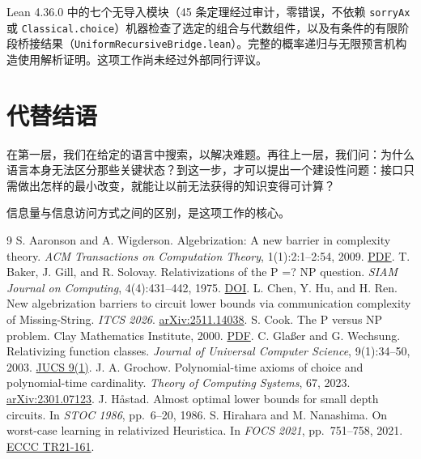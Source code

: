 \documentclass[11pt,a4paper]{article}
\begin{document}
Lean 4.36.0 中的七个无导入模块（45 条定理经过审计，零错误，不依赖 \texttt{sorryAx} 或 \texttt{Classical.choice}）机器检查了选定的组合与代数组件，以及有条件的有限阶段桥接结果（\texttt{UniformRecursiveBridge.lean}）。完整的概率递归与无限预言机构造使用解析证明。这项工作尚未经过外部同行评议。

\section{代替结语}
在第一层，我们在给定的语言中搜索，以解决难题。再往上一层，我们问：为什么语言本身无法区分那些关键状态？到这一步，才可以提出一个建设性问题：接口只需做出怎样的最小改变，就能让以前无法获得的知识变得可计算？

信息量与信息访问方式之间的区别，是这项工作的核心。
\begin{thebibliography}{9}
 S. Aaronson and A. Wigderson. Algebrization: A new barrier in complexity theory. \textit{ACM Transactions on Computation Theory}, 1(1):2:1--2:54, 2009. \href{https://www.scottaaronson.com/papers/alg.pdf}{PDF}.
 T. Baker, J. Gill, and R. Solovay. Relativizations of the P =? NP question. \textit{SIAM Journal on Computing}, 4(4):431--442, 1975. \href{https://epubs.siam.org/doi/10.1137/0204037}{DOI}.
 L. Chen, Y. Hu, and H. Ren. New algebrization barriers to circuit lower bounds via communication complexity of Missing-String. \textit{ITCS 2026}. \href{https://arxiv.org/abs/2511.14038}{arXiv:2511.14038}.
 S. Cook. The P versus NP problem. Clay Mathematics Institute, 2000. \href{https://www.claymath.org/wp-content/uploads/2022/06/pvsnp.pdf}{PDF}.
 C. Glaßer and G. Wechsung. Relativizing function classes. \textit{Journal of Universal Computer Science}, 9(1):34--50, 2003. \href{https://lib.jucs.org/issue/4069/}{JUCS 9(1)}.
 J. A. Grochow. Polynomial-time axioms of choice and polynomial-time cardinality. \textit{Theory of Computing Systems}, 67, 2023. \href{https://arxiv.org/abs/2301.07123}{arXiv:2301.07123}.
 J. H\aa stad. Almost optimal lower bounds for small depth circuits. In \textit{STOC 1986}, pp.~6--20, 1986.
 S. Hirahara and M. Nanashima. On worst-case learning in relativized Heuristica. In \textit{FOCS 2021}, pp.~751--758, 2021. \href{https://eccc.weizmann.ac.il/report/2021/161/download}{ECCC TR21-161}.
\end{thebibliography}
\end{document}
